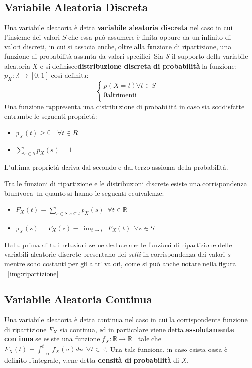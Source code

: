 \documentclass[a4paper,12pt, oneside]{book}
\newcommand{\numberset}{\mathbb}
\newcommand{\R}{\numberset{R}}
\begin{document}
\subsection{Variabile Aleatoria Discreta}
Una variabile aleatoria è detta \textbf{variabile aleatoria discreta} nel caso in cui l'insieme dei valori $S$
che essa può assumere  è finita oppure da un infinito di valori discreti, in cui si associa anche, oltre alla
funzione di ripartizione, una funzione di probabilità assunta da valori specifici.\newline
Sia $S$ il supporto della variabile aleatoria $X$ e si definisce\textbf{distribuzione discreta di probabilità} la funzione:
$p_X:\R \to [0,1]$ così definita:
\[\begin{cases}
    p(X = t) \forall t \in S\\
    0    \mbox{altrimenti}\\
\end{cases}\]
Una funzione rappresenta una distribuzione di probabilità in caso sia soddisfatte entrambe le seguenti proprietà:
\begin{itemize}
    \item $p_X(t) \geq 0 \quad \forall t \in R$
    \item $\sum _{s \in S} p_X(s) = 1$
\end{itemize}
L'ultima proprietà deriva dal secondo e dal terzo assioma della probabilità.

Tra le funzioni di ripartizione e le distribuzioni discrete esiste una corrispondenza biunivoca, in quanto
si hanno le seguenti equivalenze:
\begin{itemize}
    \item $F_X(t) = \sum _{s \in S:s \subseteq t} p_X(s)\,\,\, \forall t \in \R$
    \item $p_X(s) = F_X(s) - \lim _{t \to s^{-}} F_X(t)\,\,\, \forall s \in S$
\end{itemize}
Dalla prima di tali relazioni se ne deduce che le funzioni di ripartizione delle variabili
aleatorie discrete presentano dei \textit{salti} in corrispondenza dei valori \textit{s} mentre
sono costanti per gli altri valori, come si può anche notare nella figura ~\ref{img:ripartizione}

\subsection{Variabile Aleatoria Continua}
Una variabile aleatoria è detta continua nel caso in cui la corrispondente funzione di ripartizione $F_X$ sia
continua, ed in particolare viene detta \textbf{assolutamente continua} se esiste una funzione
$f_X:\R \to \R_+$ tale che $F_X(t) = \int _{-\infty}^t f_X(u)du \,\,\, \forall t \in \R$.
Una tale funzione, in caso esista ossia è definito l'integrale, viene detta \textbf{densità di probabilità }di $X$.
\end{document}
